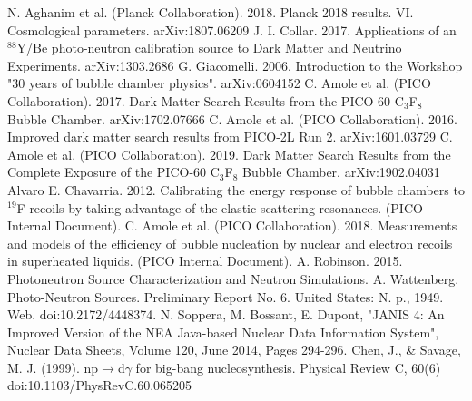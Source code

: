 \documentclass[%
12pt,
twoside,
reprint,
amsmath,amssymb,
aps,
]{article}
\begin{document}
	\pagebreak
	\small
	\begin{thebibliography}{1}
		 N. Aghanim et al. (Planck Collaboration). 2018. Planck 2018 results. VI. Cosmological parameters. arXiv:1807.06209 
		 J. I. Collar. 2017. Applications of an $^{88}$Y/Be photo-neutron calibration source
		to Dark Matter and Neutrino Experiments. arXiv:1303.2686
		 G. Giacomelli. 2006. Introduction to the Workshop "30 years of bubble chamber physics". arXiv:0604152
		 C. Amole et al. (PICO Collaboration). 2017. Dark Matter Search Results from the PICO-60 C$_{3}$F$_{8}$ Bubble Chamber. arXiv:1702.07666 
		 C. Amole et al. (PICO Collaboration). 2016. Improved dark matter search results from PICO-2L Run 2. arXiv:1601.03729
		 C. Amole et al. (PICO Collaboration). 2019. Dark Matter Search Results from the  Complete Exposure of the PICO-60 C$_{3}$F$_{8}$ Bubble Chamber. arXiv:1902.04031 
		 Alvaro E. Chavarria. 2012. Calibrating the energy response of bubble chambers to $^{19}$F recoils by taking advantage of the elastic scattering resonances. (PICO Internal Document).
		 C. Amole et al. (PICO Collaboration). 2018. Measurements and models of the efficiency of bubble nucleation by nuclear and electron recoils in superheated liquids. (PICO Internal Document).
		 A. Robinson. 2015. Photoneutron Source Characterization and Neutron Simulations.
		 A. Wattenberg. Photo-Neutron Sources. Preliminary Report No. 6. United States: N. p., 1949. Web. doi:10.2172/4448374.
		 N. Soppera, M. Bossant, E. Dupont, "JANIS 4: An Improved Version of the NEA Java-based Nuclear Data Information System", Nuclear Data Sheets, Volume 120, June 2014, Pages 294-296.
		 Chen, J., \& Savage, M. J. (1999). np$\rightarrow$d$\gamma$ for big-bang nucleosynthesis. Physical Review C, 60(6) doi:10.1103/PhysRevC.60.065205
		
	\end{thebibliography}
	\normalsize
%
\end{document}
